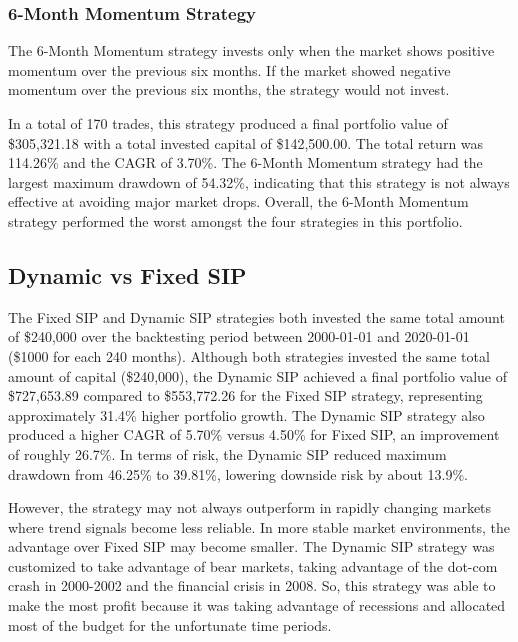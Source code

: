 \documentclass[12pt]{article}
\begin{document}
\subsubsection{6-Month Momentum Strategy}

The 6-Month Momentum strategy invests only when the market shows positive momentum over the 
previous six months. If the market showed negative momentum over the previous six months, the 
strategy would not invest. 

In a total of 170 trades, this strategy produced a final portfolio value of \$305,321.18 with 
a total invested capital of \$142,500.00. The total return was 114.26\% and the CAGR of 3.70\%. 
The 6-Month Momentum strategy had the largest maximum drawdown of 54.32\%, 
indicating that this strategy is not always effective at avoiding major market drops. 
Overall, the 6-Month Momentum strategy performed the worst amongst the four strategies in this 
portfolio. 

\subsection{Dynamic vs Fixed SIP}
The Fixed SIP and Dynamic SIP strategies both invested the same total amount of \$240,000 over the 
backtesting period between 2000-01-01 and 2020-01-01 (\$1000 for each 240 months). 
Although both strategies invested the same total amount of capital (\$240,000), the Dynamic SIP achieved a 
final portfolio value of \$727,653.89 compared to \$553,772.26 for the Fixed SIP strategy, representing 
approximately 31.4\% higher portfolio growth. The Dynamic SIP strategy also produced a higher CAGR 
of 5.70\% versus 4.50\% for Fixed SIP, an improvement of roughly 26.7\%. 
In terms of risk, the Dynamic SIP reduced maximum drawdown from 46.25\% to 39.81\%, lowering downside risk 
by about 13.9\%. 

However, the strategy may not always outperform in rapidly changing markets where trend signals become 
less reliable. In more stable market environments, the advantage over Fixed SIP may become smaller. 
The Dynamic SIP strategy was customized to take advantage of bear markets, taking advantage of the dot-com 
crash in 2000-2002 and the financial crisis in 2008. So, this strategy was able to make the most profit 
because it was taking advantage of recessions and allocated most of the budget for the unfortunate time periods. 
\end{document}
